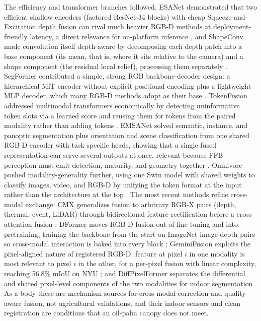 The efficiency and transformer branches followed. ESANet demonstrated that two efficient shallow encoders (factored ResNet-34 blocks) with cheap Squeeze-and-Excitation depth fusion can rival much heavier RGB-D methods at deployment-friendly latency, a direct relevance for on-platform inference \cite{seichter2021esanet}, and ShapeConv made convolution itself depth-aware by decomposing each depth patch into a base component (its mean, that is, where it sits relative to the camera) and a shape component (the residual local relief), processing them separately \cite{cao2021shapeconv}. SegFormer contributed a simple, strong RGB backbone-decoder design: a hierarchical MiT encoder without explicit positional encoding plus a lightweight MLP decoder, which many RGB-D methods adopt as their base \cite{xie2021segformer}. TokenFusion addressed multimodal transformers economically by detecting uninformative token slots via a learned score and reusing them for tokens from the paired modality rather than adding tokens \cite{wang2022tokenfusion}. EMSANet solved semantic, instance, and panoptic segmentation plus orientation and scene classification from one shared RGB-D encoder with task-specific heads, showing that a single fused representation can serve several outputs at once, relevant because FFB perception must emit detection, maturity, and geometry together \cite{seichter2022emsanet}. Omnivore pushed modality-generality further, using one Swin model with shared weights to classify images, video, and RGB-D by unifying the token format at the input rather than the architecture at the top \cite{girdhar2022omnivore}. The most recent methods refine cross-modal exchange: CMX generalizes fusion to arbitrary RGB-X pairs (depth, thermal, event, LiDAR) through bidirectional feature rectification before a cross-attention fusion \cite{zhang2023cmx}; DFormer moves RGB-D fusion out of fine-tuning and into pretraining, training the backbone from the start on ImageNet image-depth pairs so cross-modal interaction is baked into every block \cite{yin2024dformer}; GeminiFusion exploits the pixel-aligned nature of registered RGB-D: feature at pixel $i$ in one modality is most relevant to pixel $i$ in the other, for a per-pixel fusion with linear complexity, reaching 56.8\% mIoU on NYU \cite{jia2024geminifusion}; and DiffPixelFormer separates the differential and shared pixel-level components of the two modalities for indoor segmentation \cite{gong2025diffpixelformer}. As a body these are mechanism sources for cross-modal correction and quality-aware fusion, not agricultural validations, and their indoor sensors and clean registration are conditions that an oil-palm canopy does not meet.

